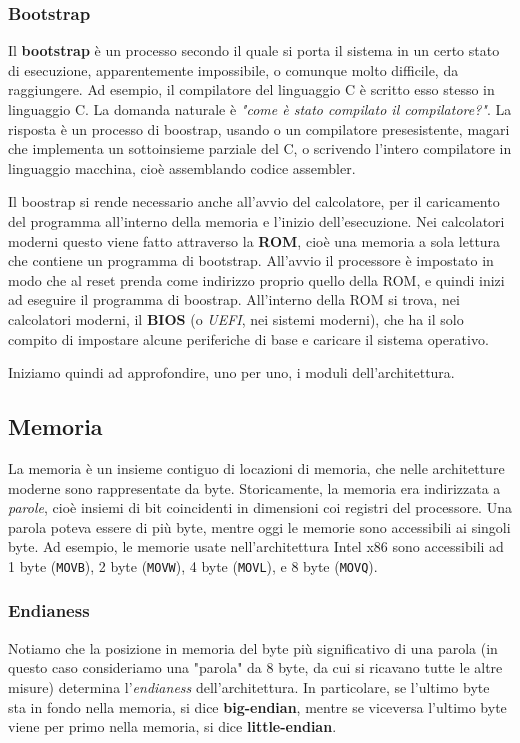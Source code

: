 \documentclass[a4paper,11pt]{article}
\begin{document}
\subsubsection{Bootstrap}
Il \textbf{bootstrap} è un processo secondo il quale si porta il sistema in un certo stato di esecuzione, apparentemente impossibile, o comunque molto difficile, da raggiungere.
Ad esempio, il compilatore del linguaggio C è scritto esso stesso in linguaggio C.
La domanda naturale è \textit{"come è stato compilato il compilatore?"}.
La risposta è un processo di boostrap, usando o un compilatore presesistente, magari che implementa un sottoinsieme parziale del C, o scrivendo l'intero compilatore in linguaggio macchina, cioè assemblando codice assembler.

Il boostrap si rende necessario anche all'avvio del calcolatore, per il caricamento del programma all'interno della memoria e l'inizio dell'esecuzione.
Nei calcolatori moderni questo viene fatto attraverso la \textbf{ROM}, cioè una memoria a sola lettura che contiene un programma di bootstrap.
All'avvio il processore è impostato in modo che al reset prenda come indirizzo proprio quello della ROM, e quindi inizi ad eseguire il programma di boostrap.
All'interno della ROM si trova, nei calcolatori moderni, il \textbf{BIOS} (o \textit{UEFI}, nei sistemi moderni), che ha il solo compito di impostare alcune periferiche di base e caricare il sistema operativo.

\par\medskip 

Iniziamo quindi ad approfondire, uno per uno, i moduli dell'architettura.

\subsection{Memoria}
La memoria è un insieme contiguo di locazioni di memoria, che nelle architetture moderne sono rappresentate da byte.
Storicamente, la memoria era indirizzata a \textit{parole}, cioè insiemi di bit coincidenti in dimensioni coi registri del processore.
Una parola poteva essere di più byte, mentre oggi le memorie sono accessibili ai singoli byte.
Ad esempio, le memorie usate nell'architettura Intel x86 sono accessibili ad 1 byte (\lstinline|MOVB|), 2 byte (\lstinline|MOVW|), 4 byte (\lstinline|MOVL|), e 8 byte (\lstinline|MOVQ|).

\subsubsection{Endianess}
Notiamo che la posizione in memoria del byte più significativo di una parola (in questo caso consideriamo una "parola" da 8 byte, da cui si ricavano tutte le altre misure) determina l'\textit{endianess} dell'architettura.
In particolare, se l'ultimo byte sta in fondo nella memoria, si dice \textbf{big-endian}, mentre se viceversa l'ultimo byte viene per primo nella memoria, si dice \textbf{little-endian}.
\end{document}
